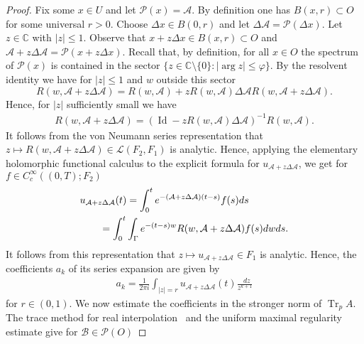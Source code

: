 \documentclass[reqno,a4paper,final]{amsart}
\numberwithin{equation}{section}
\theoremstyle{definition}
\let\temp\phi
\let\phi\varphi
\let\varphi\temp
\begin{document}
	\begin{proof}
		Fix some $x \in U$ and let $\mathcal{P}(x) = \mathcal{A}$. By definition one has $B(x,r) \subset O$ for some universal $r > 0$. Choose $\Delta x \in B(0,r)$ and let $\Delta \mathcal{A} = \mathcal{P}(\Delta x)$. Let $z \in {\mathbb{C}}$ with ${\left\lvert{z}\right\rvert} \le 1$. Observe that $x + z \Delta x \in B(x,r) \subset O$ and $\mathcal{A} + z \Delta \mathcal{A} = \mathcal{P}(x + z \Delta x)$. Recall that, by definition, for all $x \in O$ the spectrum of $\mathcal{P}(x)$ is contained in the sector $\{ z \in {\mathbb{C}} \setminus \{ 0 \}: {\left\lvert{\arg z}\right\rvert} \le \phi \}$. By the resolvent identity we have for ${\left\lvert{z}\right\rvert} \le 1$ and $w$ outside this sector
			\begin{equation*}
				R(w, \mathcal{A} + z \Delta \mathcal{A}) = R(w, \mathcal{A}) + z R(w, \mathcal{A}) \Delta \mathcal{A} R(w, \mathcal{A} + z \Delta \mathcal{A}).
			\end{equation*}
		Hence, for ${\left\lvert{z}\right\rvert}$ sufficiently small we have
			\begin{align*}
				R(w, \mathcal{A} + z \Delta \mathcal{A}) = (\operatorname{Id} - zR(w,\mathcal{A}) \Delta \mathcal{A})^{-1} R(w, \mathcal{A}).
			\end{align*}
		It follows from the von Neumann series representation that $z \mapsto R(w, \mathcal{A} + z\Delta \mathcal{A}) \in \mathcal{L}(F_2,F_1)$ is analytic. Hence, applying the elementary holomorphic functional calculus to the explicit formula for $u_{\mathcal{A} + z \Delta \mathcal{A}}$, we get for $f \in C_c^{\infty}((0,T);F_2)$
			\begin{align*}
				\MoveEqLeft u_{\mathcal{A} + z \Delta \mathcal{A}}(t) = \int_0^t e^{-(\mathcal{A} + z \Delta \mathcal{A})(t-s)} f(s) {\mathop{}\!d} s \\
				& = \int_0^t \int_{\Gamma} e^{-(t-s) w} R(w, \mathcal{A} + z \Delta \mathcal{A}) f(s) {\mathop{}\!d} w {\mathop{}\!d} s. 			\end{align*}
		It follows from this representation that $z \mapsto u_{\mathcal{A} + z\Delta \mathcal{A}} \in F_1$ is analytic. Hence, the coefficients $a_k$ of its series expansion are given by
			\begin{align*}
				a_k = \frac{1}{2\pi i} \int_{{\left\lvert{z}\right\rvert} = r} u_{\mathcal{A} + z \Delta \mathcal{A}}(t) \frac{{\mathop{}\!d} z}{z^{k+1}}
			\end{align*}
		for $r \in (0,1)$. We now estimate the coefficients in the stronger norm of $\operatorname{Tr}_p A$. The trace method for real interpolation~\cite[Section~1.2.2]{Lun95} and the uniform maximal regularity estimate give for $\mathcal{B} \in \mathcal{P}(O)$

\end{proof}
\end{document}
